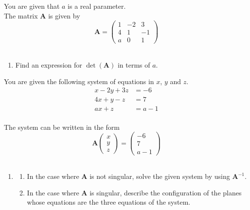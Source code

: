 \documentclass[leqno]{article}
\begin{document}
\begin{enumerate}[
  label=\textbf{\arabic*.},
  leftmargin=*,
  topsep=0pt,
  partopsep=0pt,
  parsep=0pt
]
You are given that $a$ is a real parameter. \\

The matrix $\mathbf{A}$ is given by
\[
\mathbf{A}=\begin{pmatrix}
1 & -2 & 3 \\
4 & 1 & -1 \\
a & 0 & 1
\end{pmatrix}
\] \\

\begin{enumerate}[label=\textbf{(\alph*)}]
  \item Find an expression for $\det(\mathbf{A})$ in terms of $a$.  \\
\end{enumerate}

You are given the following system of equations in $x$, $y$ and $z$. \\

\[
\begin{aligned}
x-2y+3z&=-6 \\
4x+y-z&=7 \\
ax+z&=a-1
\end{aligned}
\] \\

The system can be written in the form
\[
\mathbf{A}\begin{pmatrix}x \\ y \\ z\end{pmatrix}=\begin{pmatrix}-6 \\ 7 \\ a-1\end{pmatrix}
\] \\

\begin{enumerate}[label=\textbf{(\alph*)}, resume]
  \item
  \begin{enumerate}[label=(\roman*)]
    \item In the case where $\mathbf{A}$ is not singular, solve the given system by using $\mathbf{A}^{-1}$. 
    \item In the case where $\mathbf{A}$ is singular, describe the configuration of the planes whose equations are the three equations of the system.  \\
  \end{enumerate}
\end{enumerate}


\end{enumerate}
\end{document}
